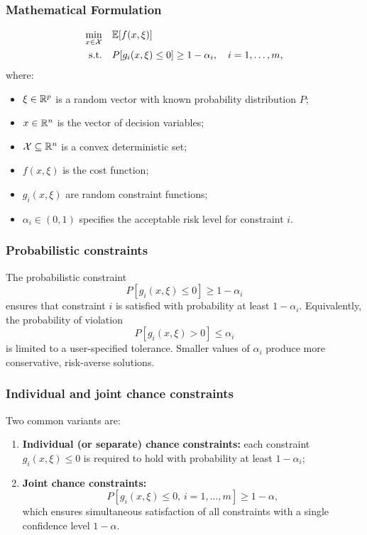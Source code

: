 \documentclass[aspectratio=169]{beamer}
\begin{document}
\begin{frame}
\frametitle{Mathematical Formulation}

$$
\begin{aligned}
	\min_{x \in {\mathcal{X}}} \quad & {\mathbb{E}}[f(x, \xi)] \\
	\text{s.t.} \quad & P[ g_i(x, \xi) \leq 0 ] \geq 1 - \alpha_i, \quad i = 1, \ldots, m,
\end{aligned}
$$
where:
\begin{itemize}
	\item \( \xi \in {\mathbb{R}}^p \) is a random vector with known probability distribution \( P \);
	\item \( x \in {\mathbb{R}}^n \) is the vector of decision variables;
	\item \( {\mathcal{X}} \subseteq {\mathbb{R}}^n \) is a convex deterministic set;
	\item \( f(x, \xi) \) is the cost function;
	\item \( g_i(x, \xi) \) are random constraint functions;
	\item \( \alpha_i \in (0, 1) \) specifies the acceptable risk level for constraint \( i \).
\end{itemize}

\end{frame}

\begin{frame}
\frametitle{Probabilistic constraints}

The probabilistic constraint 
\[
P[ g_i(x, \xi) \leq 0 ] \geq 1 - \alpha_i
\]
ensures that constraint \( i \) is satisfied with probability at least \( 1 - \alpha_i \). Equivalently, the probability of violation 
\[
P[ g_i(x, \xi) > 0 ] \leq \alpha_i
\]
is limited to a user-specified tolerance. Smaller values of \( \alpha_i \) produce more conservative, risk-averse solutions.

\end{frame}

\begin{frame}
\frametitle{Individual and joint chance constraints}

Two common variants are:
\begin{enumerate}
	\item \textbf{Individual (or separate) chance constraints:} each constraint \( g_i(x, \xi) \leq 0 \) is required to hold with probability at least \( 1 - \alpha_i \);
	\item \textbf{Joint chance constraints:}
	\[
	P[ g_i(x, \xi) \leq 0, \, i=1,\ldots,m ] \geq 1 - \alpha,
	\]
	which ensures simultaneous satisfaction of all constraints with a single confidence level \( 1 - \alpha \).
\end{enumerate}

\end{frame}
\end{document}
